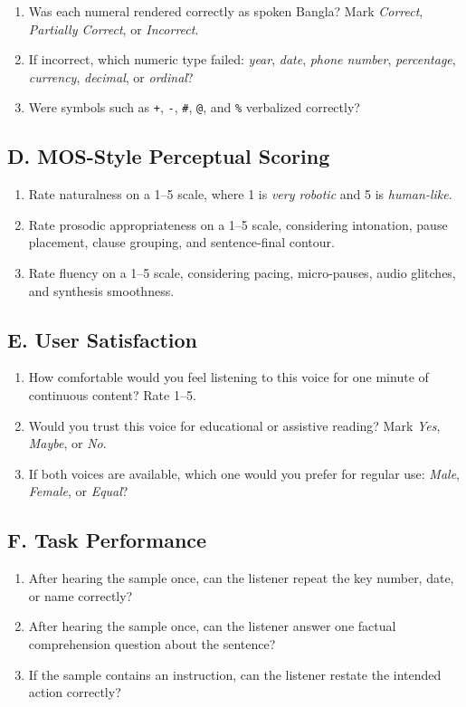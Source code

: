 \begin{enumerate}
\item Was each numeral rendered correctly as spoken Bangla? Mark \textit{Correct}, \textit{Partially Correct}, or \textit{Incorrect}.
\item If incorrect, which numeric type failed: \textit{year}, \textit{date}, \textit{phone number}, \textit{percentage}, \textit{currency}, \textit{decimal}, or \textit{ordinal}?
\item Were symbols such as \texttt{+}, \texttt{-}, \texttt{\#}, \texttt{@}, and \texttt{\%} verbalized correctly?
\end{enumerate}

\subsection*{D. MOS-Style Perceptual Scoring}

\begin{enumerate}
\item Rate naturalness on a 1--5 scale, where 1 is \textit{very robotic} and 5 is \textit{human-like}.
\item Rate prosodic appropriateness on a 1--5 scale, considering intonation, pause placement, clause grouping, and sentence-final contour.
\item Rate fluency on a 1--5 scale, considering pacing, micro-pauses, audio glitches, and synthesis smoothness.
\end{enumerate}

\subsection*{E. User Satisfaction}

\begin{enumerate}
\item How comfortable would you feel listening to this voice for one minute of continuous content? Rate 1--5.
\item Would you trust this voice for educational or assistive reading? Mark \textit{Yes}, \textit{Maybe}, or \textit{No}.
\item If both voices are available, which one would you prefer for regular use: \textit{Male}, \textit{Female}, or \textit{Equal}?
\end{enumerate}

\subsection*{F. Task Performance}

\begin{enumerate}
\item After hearing the sample once, can the listener repeat the key number, date, or name correctly?
\item After hearing the sample once, can the listener answer one factual comprehension question about the sentence?
\item If the sample contains an instruction, can the listener restate the intended action correctly?
\end{enumerate}
